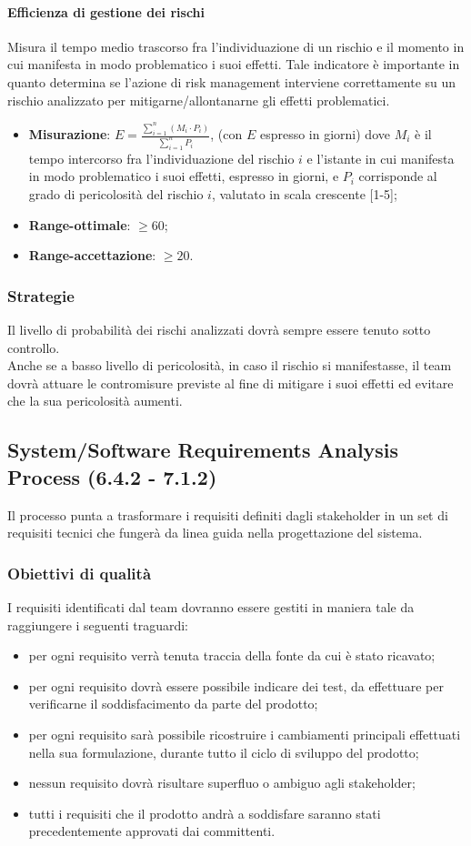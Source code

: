 \paragraph{Efficienza di gestione dei rischi}
\label{effGestRischi}
Misura il tempo medio trascorso fra l'individuazione di un rischio e il momento in cui manifesta in modo problematico i suoi effetti. Tale indicatore è importante in quanto determina se l'azione di risk management interviene correttamente su un rischio analizzato per mitigarne/allontanarne gli effetti problematici.
\begin{itemize}
\item \textbf{Misurazione}: $E = \frac{\sum_{i=1}^{n} (M_{i} \cdot P_{i})}{\sum_{i=1}^{n} P_{i}}$, (con $E$ espresso in giorni) dove $M_{i}$ è il tempo intercorso fra l'individuazione del rischio $i$ e l'istante in cui manifesta in modo problematico i suoi effetti, espresso in giorni, e $P_{i}$ corrisponde al grado di pericolosità del rischio $i$, valutato in scala crescente [1-5];
\item \textbf{Range-ottimale}: $\geq 60$;
\item \textbf{Range-accettazione}: $\geq 20$.
\end{itemize}
\subsubsection{Strategie}
Il livello di probabilità dei rischi analizzati dovrà sempre essere tenuto sotto controllo.\\
Anche se a basso livello di pericolosità, in caso il rischio si manifestasse, il team dovrà attuare le contromisure previste al fine di mitigare i suoi effetti ed evitare che la sua pericolosità aumenti.
\subsection{System/Software Requirements Analysis Process (6.4.2 - 7.1.2)}
\label{sySoRequiAna}
Il processo punta a trasformare i requisiti definiti dagli stakeholder in un set di requisiti tecnici che fungerà da linea guida nella progettazione del sistema.
\subsubsection{Obiettivi di qualità}
I requisiti identificati dal team dovranno essere gestiti in maniera tale da raggiungere i seguenti traguardi:
\begin{itemize}
\item per ogni requisito verrà tenuta traccia della fonte da cui è stato ricavato;
\item per ogni requisito dovrà essere possibile indicare dei test, da effettuare per verificarne il soddisfacimento da parte del prodotto;
\item per ogni requisito sarà possibile ricostruire i cambiamenti principali effettuati nella sua formulazione, durante tutto il ciclo di sviluppo del prodotto;
\item nessun requisito dovrà risultare superfluo o ambiguo agli stakeholder;
\item tutti i requisiti che il prodotto andrà a soddisfare saranno stati precedentemente approvati dai committenti.
\end{itemize}

